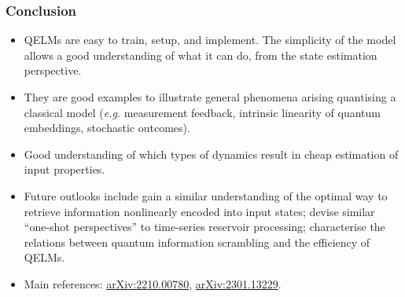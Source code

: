 \documentclass{beamer}
\begin{document}
\begin{frame}
  \frametitle{Conclusion}
  \begin{itemize}
      \item QELMs are easy to train, setup, and implement. The simplicity of the model allows a good understanding of what it can do, from the state estimation perspective.
      \item They are good examples to illustrate general phenomena arising quantising a classical model (\textit{e.g.} measurement feedback, intrinsic linearity of quantum embeddings, stochastic outcomes).
      \item Good understanding of which types of dynamics result in cheap estimation of input properties.
      \item Future outlooks include gain a similar understanding of the optimal way to retrieve information nonlinearly encoded into input states; devise similar ``one-shot perspectives'' to time-series reservoir processing; characterise the relations between quantum information scrambling and the efficiency of QELMs.
      \item Main references: \href{https://arxiv.org/abs/2210.00780}{arXiv:2210.00780}, \href{https://arxiv.org/abs/2301.13229}{arXiv:2301.13229}.
  \end{itemize}
\end{frame}
\end{document}
